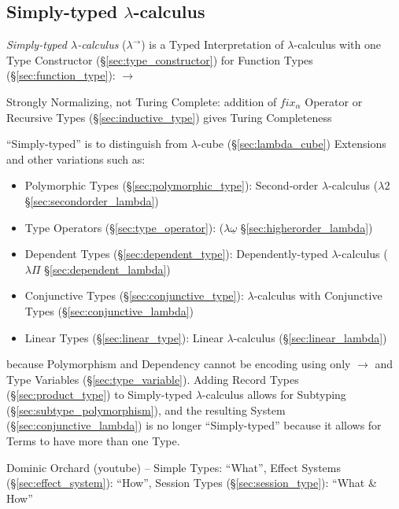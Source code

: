 \subsection{Simply-typed $\lambda$-calculus}\label{sec:simply_typed}

\emph{Simply-typed $\lambda$-calculus} ($\lambda^\rightarrow$) is a
Typed Interpretation of $\lambda$-calculus with one Type Constructor
(\S\ref{sec:type_constructor}) for Function Types
(\S\ref{sec:function_type}): $\rightarrow$

Strongly Normalizing, not Turing Complete: addition of $fix_\alpha$
Operator or Recursive Types (\S\ref{sec:inductive_type}) gives
Turing Completeness

``Simply-typed'' is to distinguish from $\lambda$-cube
(\S\ref{sec:lambda_cube}) Extensions and other variations such as:
\begin{itemize}
  \item Polymorphic Types (\S\ref{sec:polymorphic_type}): Second-order
    $\lambda$-calculus ($\lambda2$ \S\ref{sec:secondorder_lambda})
  \item Type Operators (\S\ref{sec:type_operator}):
    ($\lambda\underline{\omega}$ \S\ref{sec:higherorder_lambda})
  \item Dependent Types (\S\ref{sec:dependent_type}):
    Dependently-typed $\lambda$-calculus ($\lambda\Pi$
    \S\ref{sec:dependent_lambda})
  \item Conjunctive Types (\S\ref{sec:conjunctive_type}):
    $\lambda$-calculus with Conjunctive Types
    (\S\ref{sec:conjunctive_lambda})
  \item Linear Types (\S\ref{sec:linear_type}): Linear
    $\lambda$-calculus (\S\ref{sec:linear_lambda})
\end{itemize}
because Polymorphism and Dependency cannot be encoding using only
$\rightarrow$ and Type Variables (\S\ref{sec:type_variable}). Adding
Record Types (\S\ref{sec:product_type}) to Simply-typed
$\lambda$-calculus allows for Subtyping
(\S\ref{sec:subtype_polymorphism}), and the resulting System
(\S\ref{sec:conjunctive_lambda}) is no longer ``Simply-typed'' because
it allows for Terms to have more than one Type.

Dominic Orchard (youtube) -- Simple Types: ``What'', Effect Systems
(\S\ref{sec:effect_system}): ``How'', Session Types
(\S\ref{sec:session_type}): ``What \& How''

